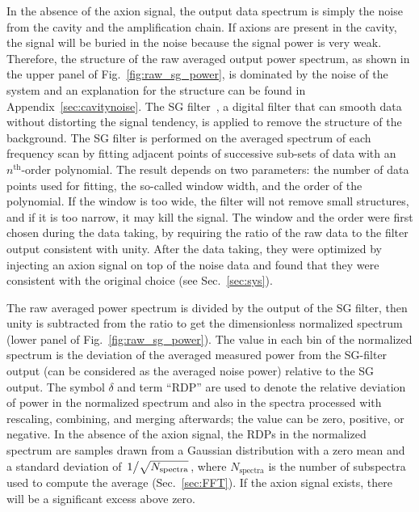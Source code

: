 In the absence of the axion signal, the output data spectrum is simply the 
noise from the cavity and the amplification chain. If axions are present 
in the cavity, the signal will be buried in the noise because the 
signal power is very weak. Therefore, the structure of the raw averaged 
output power spectrum, as shown in the upper panel of 
Fig.~\ref{fig:raw_sg_power}, is dominated 
by the noise of the system and an explanation for the structure can be found 
in Appendix~\ref{sec:cavitynoise}. The SG 
filter~\cite{SGFilter}, a digital filter that can smooth data without 
distorting the signal tendency, is applied to remove the structure of the  
background. The SG filter is performed on the averaged spectrum of each 
frequency scan by fitting adjacent points of successive sub-sets of data with 
an $n^\text{th}$-order polynomial. The result depends on two parameters: 
the number of 
data points used for fitting, the so-called window width, and the order of 
the polynomial. If the window is too wide, the filter will not remove small 
structures, and if it is too narrow, it may kill the signal. 
The window and the order were first chosen during the data taking, by 
requiring the ratio of the raw data to the filter 
output consistent with unity.  
After the data taking, they were optimized by injecting an axion signal on 
top of 
the noise data and found that they were consistent with the original choice 
(see Sec.~\ref{sec:sys}). 

The raw averaged power spectrum is divided by the output of the SG filter, 
then unity is subtracted from the ratio to get the dimensionless 
normalized spectrum (lower panel of Fig.~\ref{fig:raw_sg_power}). The value 
in each bin of the normalized spectrum is the deviation of the 
averaged measured power from the SG-filter output (can be considered 
as the averaged noise power) relative to the SG output. The symbol 
$\delta$ and term ``RDP'' are used to denote the relative deviation of power 
in the normalized spectrum and also in the spectra processed with rescaling, 
combining, and merging afterwards; the value can be zero, positive, or negative. 
In the absence of the axion signal, the RDPs in the normalized spectrum are 
samples drawn from a Gaussian 
distribution with a zero mean and a standard deviation of 
$\left.1\middle/\sqrt{N_\text{spectra}}\right.$, where $N_\text{spectra}$ is 
the number of subspectra used to compute the average (Sec.~\ref{sec:FFT}). 
If the axion signal exists, there will be a significant excess above zero. 
 
